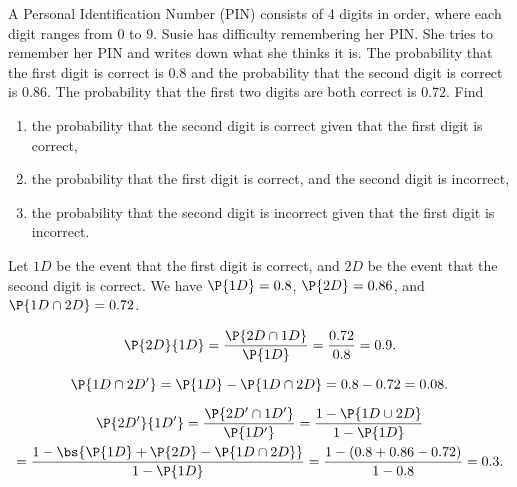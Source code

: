 \begin{problem}
    A Personal Identification Number (PIN) consists of 4 digits in order, where each digit ranges from 0 to 9. Susie has difficulty remembering her PIN. She tries to remember her PIN and writes down what she thinks it is. The probability that the first digit is correct is $0.8$ and the probability that the second digit is correct is $0.86$. The probability that the first two digits are both correct is $0.72$. Find
    \begin{enumerate}
        \item the probability that the second digit is correct given that the first digit is correct,
        \item the probability that the first digit is correct, and the second digit is incorrect,
        \item the probability that the second digit is incorrect given that the first digit is incorrect.
    \end{enumerate}
\end{problem}
\begin{solution}
    Let $1D$ be the event that the first digit is correct, and $2D$ be the event that the second digit is correct. We have $\P{1D} = 0.8$, $\P{2D} = 0.86$, and $\P{1D \cap 2D} = 0.72$.

    \begin{ppart}
        \[\P{2D}{1D} = \frac{\P{2D \cap 1D}}{\P{1D}} = \frac{0.72}{0.8} = 0.9.\]
    \end{ppart}
    \begin{ppart}
        \[\P{1D \cap 2D'} = \P{1D} - \P{1D \cap 2D} = 0.8 - 0.72 = 0.08.\]
    \end{ppart}
    \begin{ppart}
        \begin{gather*}
            \P{2D'}{1D'} = \frac{\P{2D' \cap 1D'}}{\P{1D'}} = \frac{1 - \P{1D \cup 2D}}{1 - \P{1D}} \\
            = \frac{1 - \bs{\P{1D} + \P{2D} - \P{1D \cap 2D}}}{1 - \P{1D}} = \frac{1 - (0.8 + 0.86 - 0.72)}{1 - 0.8} = 0.3.
        \end{gather*}
    \end{ppart}
\end{solution}

